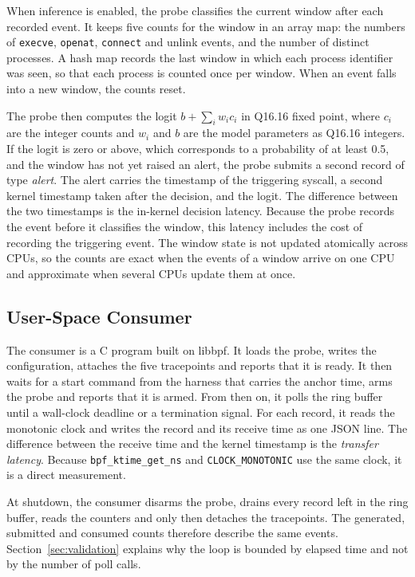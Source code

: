 When inference is enabled, the probe classifies the current window after each recorded event. It keeps five counts for the window in an array map: the numbers of \texttt{execve}, \texttt{openat}, \texttt{connect} and unlink events, and the number of distinct processes. A hash map records the last window in which each process identifier was seen, so that each process is counted once per window. When an event falls into a new window, the counts reset.

The probe then computes the logit $b + \sum_i w_i c_i$ in Q16.16 fixed point, where $c_i$ are the integer counts and $w_i$ and $b$ are the model parameters as Q16.16 integers. If the logit is zero or above, which corresponds to a probability of at least 0.5, and the window has not yet raised an alert, the probe submits a second record of type \emph{alert}. The alert carries the timestamp of the triggering syscall, a second kernel timestamp taken after the decision, and the logit. The difference between the two timestamps is the in-kernel decision latency. Because the probe records the event before it classifies the window, this latency includes the cost of recording the triggering event. The window state is not updated atomically across CPUs, so the counts are exact when the events of a window arrive on one CPU and approximate when several CPUs update them at once.

\subsection{User-Space Consumer}

The consumer is a C program built on libbpf. It loads the probe, writes the configuration, attaches the five tracepoints and reports that it is ready. It then waits for a start command from the harness that carries the anchor time, arms the probe and reports that it is armed. From then on, it polls the ring buffer until a wall-clock deadline or a termination signal. For each record, it reads the monotonic clock and writes the record and its receive time as one JSON line. The difference between the receive time and the kernel timestamp is the \emph{transfer latency}. Because \texttt{bpf\_ktime\_get\_ns} and \texttt{CLOCK\_MONOTONIC} use the same clock, it is a direct measurement.

At shutdown, the consumer disarms the probe, drains every record left in the ring buffer, reads the counters and only then detaches the tracepoints. The generated, submitted and consumed counts therefore describe the same events. Section~\ref{sec:validation} explains why the loop is bounded by elapsed time and not by the number of poll calls.

